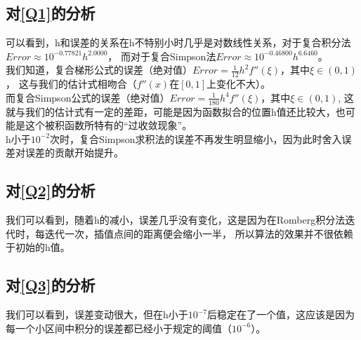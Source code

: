 \documentclass[a4paper,11pt,notitlepage]{article}
\begin{document}
\subsection{对\ref{Q1}的分析}
可以看到，h和误差的关系在h不特别小时几乎是对数线性关系，对于复合积分法$Error\approx 10^{-0.77821}h^{2.0000}$，
而对于复合Simpson法$Error\approx 10^{-0.46800}h^{6.6460}$。\\
\indent 我们知道，复合梯形公式的误差（绝对值）$Error=\frac{1}{12}h^2f''(\xi )$，其中$\xi \in (0,1)$，
这与我们的估计式相吻合（$f''(x)$在$[0,1]$上变化不大）。\\
\indent 而复合Simpson公式的误差（绝对值）$Error=\frac{1}{180}h^4f''(\xi )$，其中$\xi \in (0,1)$,
这就与我们的估计式有一定的差距，可能是因为函数拟合的位置h值还比较大，也可能是这个被积函数所特有的“过收敛现象”。\\
\indent h小于$10^{-2}$次时，复合Simpson求积法的误差不再发生明显缩小，因为此时舍入误差对误差的贡献开始提升。

\subsection{对\ref{Q2}的分析}
我们可以看到，随着h的减小，误差几乎没有变化，这是因为在Romberg积分法迭代时，每迭代一次，插值点间的距离便会缩小一半，
所以算法的效果并不很依赖于初始的h值。

\subsection{对\ref{Q3}的分析}
我们可以看到，误差变动很大，但在h小于$10^{-7}$后稳定在了一个值，这应该是因为每一个小区间中积分的误差都已经小于规定的阈值（$10^{-6}$）。
\end{document}
